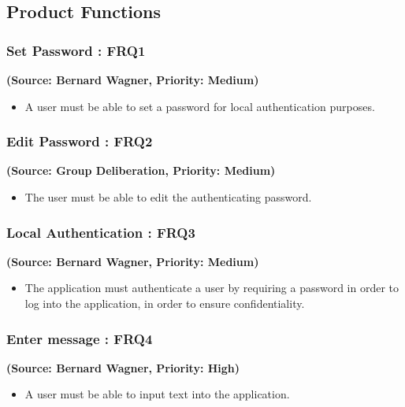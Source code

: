 \subsection{Product Functions}


\normalsize
\vspace{12pt}


\subsubsection{Set Password : FRQ1}
\textbf{(Source: Bernard Wagner, Priority: Medium)}
\begin{itemize}
\item A user must be able to set a password for local authentication purposes.
\end{itemize}
\subsubsection{Edit Password : FRQ2}
\textbf{(Source: Group Deliberation, Priority: Medium)}
\begin{itemize}
\item The user must be able to edit the authenticating password.
\end{itemize}
\subsubsection{Local Authentication : FRQ3}%
\textbf{(Source: Bernard Wagner, Priority: Medium)}
\begin{itemize}
\item The application must authenticate a user by requiring a password in order to log into the application, in order to ensure confidentiality.
\end{itemize}
\subsubsection{Enter message : FRQ4}%
\textbf{(Source: Bernard Wagner, Priority: High)}
\begin{itemize}
\item A user must be able to input text into the application.
\end{itemize}
